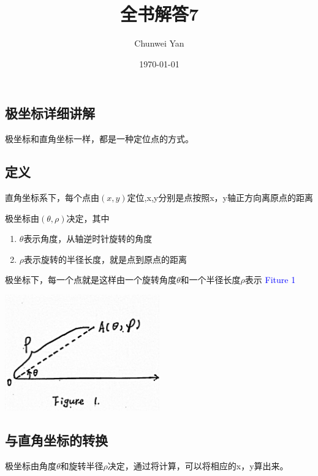 \documentclass[a4paper]{ctexart}
\title{全书解答7}
\author{Chunwei Yan}
\date{\today}
\begin{document}
\maketitle
\begin{multicols}{2}

\section{极坐标详细讲解}
\par 极坐标和直角坐标一样，都是一种定位点的方式。

\subsection{定义}
\par 直角坐标系下，每个点由$(x,y)$定位,x,y分别是点按照x，y轴正方向离原点的距离
\par 极坐标由$(\theta,\rho)$决定，其中
\begin{enumerate}
  \item $\theta$表示角度，从轴逆时针旋转的角度
  \item $\rho$表示旋转的半径长度，就是点到原点的距离
\end{enumerate}
\par 极坐标下，每一个点就是这样由一个旋转角度$\theta$和一个半径长度$\rho$表示
\textcolor{blue}{Fiture 1}
\begin{center}
\includegraphics[height=5cm]{lecture7/Figure1.jpg}
\end{center}

\subsection{与直角坐标的转换}
\par 极坐标由角度$\theta$和旋转半径$\rho$决定，通过将计算，可以将相应的x，y算出来。


\end{multicols}
\end{document}
